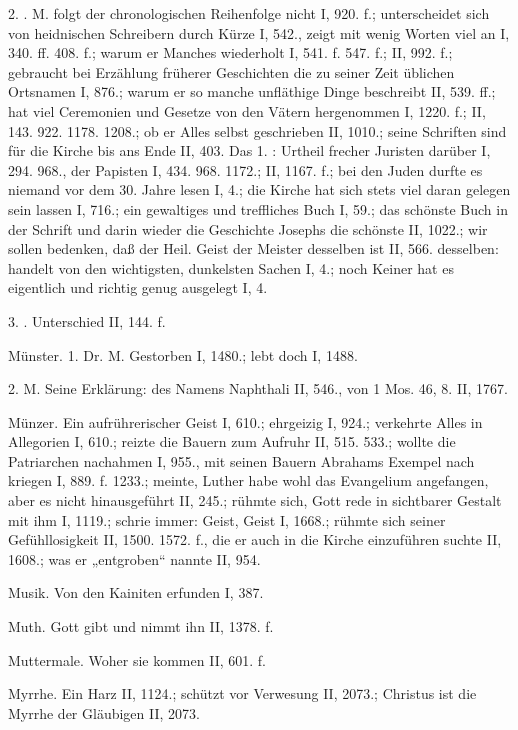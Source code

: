 2. . M. folgt der chronologischen Reihenfolge nicht I, 920. f.; unterscheidet sich von heidnischen Schreibern durch Kürze I, 542., zeigt mit wenig Worten viel an I, 340. ff. 408. f.; warum er Manches wiederholt I, 541. f. 547. f.; II, 992. f.; gebraucht bei Erzählung früherer Geschichten die zu seiner Zeit üblichen Ortsnamen I, 876.; warum er so manche unfläthige Dinge beschreibt II, 539. ff.; hat viel Ceremonien und Gesetze von den Vätern hergenommen I, 1220. f.; II, 143. 922. 1178. 1208.; ob er Alles selbst geschrieben II, 1010.; seine Schriften sind für die Kirche bis ans Ende II, 403. Das 1. : Urtheil frecher Juristen darüber I, 294. 968., der Papisten I, 434. 968. 1172.; II, 1167. f.; bei den Juden durfte es niemand vor dem 30. Jahre lesen I, 4.; die Kirche hat sich stets viel daran gelegen sein lassen I, 716.; ein gewaltiges und treffliches Buch I, 59.; das schönste Buch in der Schrift und darin wieder die Geschichte Josephs die schönste II, 1022.; wir sollen bedenken, daß der Heil. Geist der Meister desselben ist II, 566.  desselben: handelt von den wichtigsten, dunkelsten Sachen I, 4.; noch Keiner hat es eigentlich und richtig genug ausgelegt I, 4.

3. . Unterschied II, 144. f.

Münster. 1. Dr.  M. Gestorben I, 1480.; lebt doch I, 1488.

2.  M. Seine Erklärung: des Namens Naphthali II, 546., von 1 Mos. 46, 8. II, 1767.

Münzer. Ein aufrührerischer Geist I, 610.; ehrgeizig I, 924.; verkehrte Alles in Allegorien I, 610.; reizte die Bauern zum Aufruhr II, 515. 533.; wollte die Patriarchen nachahmen I, 955., mit seinen Bauern Abrahams Exempel nach kriegen I, 889. f. 1233.; meinte, Luther habe wohl das Evangelium angefangen, aber es nicht hinausgeführt II, 245.; rühmte sich, Gott rede in sichtbarer Gestalt mit ihm I, 1119.; schrie immer: Geist, Geist I, 1668.; rühmte sich seiner Gefühllosigkeit II, 1500. 1572. f., die er auch in die Kirche einzuführen suchte II, 1608.; was er „entgroben“ nannte II, 954.

Musik. Von den Kainiten erfunden I, 387.

Muth. Gott gibt und nimmt ihn II, 1378. f.

Muttermale. Woher sie kommen II, 601. f.

Myrrhe. Ein Harz II, 1124.; schützt vor Verwesung II, 2073.; Christus ist die Myrrhe der Gläubigen II, 2073.

